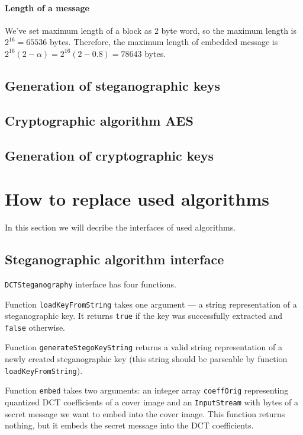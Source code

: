 \paragraph{Length of a message}
We've set maximum length of a block as 2 byte word, so the maximum length is 
$2^{16} = 65536$ bytes. Therefore, the maximum length of embedded message is 
$2^{16} (2 - \alpha) = 2^{16} (2 - 0.8) = 78643$ bytes.

\subsection{Generation of steganographic keys}

\subsection{Cryptographic algorithm AES}

\subsection{Generation of cryptographic keys}

\section{How to replace used algorithms}
In this section we will decribe the interfaces of used algorithms.

\subsection{Steganographic algorithm interface}
\texttt{DCTSteganography} interface has four functions.

Function \texttt{loadKeyFromString} takes one argument --- 
a string representation of a steganographic key. It returns
\texttt{true} if the key was successfully extracted and
\texttt{false} otherwise.

Function \texttt{generateStegoKeyString} returns a 
valid string representation of a newly created steganographic key 
(this string should be parseable by function \texttt{loadKeyFromString}).

Function \texttt{embed} takes two arguments: an integer array \texttt{coeffOrig}
representing quantized DCT coefficients of a cover image and an \texttt{InputStream} 
with bytes of a secret message we want to embed into the cover image. 
This function returns nothing, but it embeds the secret message into
the DCT coefficients. 

